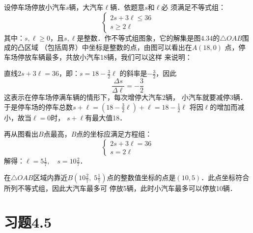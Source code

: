 \begin{solution}
设停车场停放小汽车$s$辆，大汽车$\ell$辆．依题意$s$和$\ell$必
须满足不等式组： 
\[\begin{cases}
2s+3\ell\le 36\\
s\ge 2\ell    
\end{cases}\]
其中：$s,\ell\ge 0$，且$s,\ell$是整数．作不等式组图象，它的解集是图4.34的$\triangle OAB$围成的凸区域
（包括周界）中坐标是整数的点，由图可以看出在$A(18,0)$
点，停车场停放车辆最多，共放小汽车18辆，我们可以这样
来说明：

直线$2s+3\ell =36$，即：$s=18-\frac{3}{2}\ell$
的斜率是$-\frac{3}{2}$，因此
\[\frac{\Delta s}{\Delta \ell}=-\frac{3}{2}\]
这表示在停车场停满车辆的情形下，每次增停大汽车2辆，
小汽车就要减停3辆．于是停车场的停车总数$s+\ell=\left(18-\frac{3}{2}\ell\right)+\ell=18-\frac{1}{2}\ell$
将因$\ell$的增加而减小，故当$\ell=0$时，
$s+\ell$有最大值18．

\begin{figure}[htp]
    \centering
{}
    \caption{}
\end{figure}



再从图看出$B$点最高，$B$点的坐标应满足方程组：
\[\begin{cases}
    2s+3\ell=36\\
s=2\ell
\end{cases}\]
解得：$\ell=5\frac{1}{7},\quad s=10\frac{2}{7}$．

在$\triangle OAB$区域内靠近$B\left(10\frac{2}{7},\; 5\frac{1}{7}\right)$点的整数值坐标的点是$(10,5)$．此点坐标符合所列不等式组，因此大汽车最多可
停放5辆，此时小汽车最多可以停放10辆．
\end{solution}
   
\section*{习题4.5}

